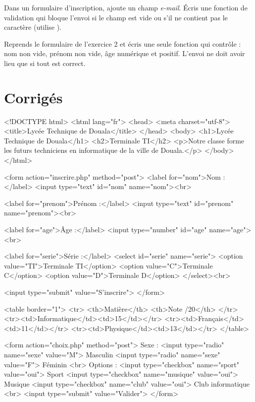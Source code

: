 Dans un formulaire d'inscription, ajoute un champ \emph{e-mail}. Écris une fonction
de validation qui bloque l'envoi si le champ est vide ou s'il ne contient pas le
caractère  (utilise ).

Reprends le formulaire de l'exercice 2 et écris une seule fonction 
qui contrôle : nom non vide, prénom non vide, âge numérique et positif. L'envoi ne
doit avoir lieu que si tout est correct.

\section{Corrigés}

\begin{codehtml}
<!DOCTYPE html>
<html lang="fr">
<head>
  <meta charset="utf-8">
  <title>Lycée Technique de Douala</title>
</head>
<body>
  <h1>Lycée Technique de Douala</h1>
  <h2>Terminale TI</h2>
  <p>Notre classe forme les futurs techniciens en informatique
     de la ville de Douala.</p>
</body>
</html>
\end{codehtml}

\begin{codehtml}
<form action="inscrire.php" method="post">
  <label for="nom">Nom :</label>
  <input type="text" id="nom" name="nom"><br>

  <label for="prenom">Prénom :</label>
  <input type="text" id="prenom" name="prenom"><br>

  <label for="age">Âge :</label>
  <input type="number" id="age" name="age"><br>

  <label for="serie">Série :</label>
  <select id="serie" name="serie">
    <option value="TI">Terminale TI</option>
    <option value="C">Terminale C</option>
    <option value="D">Terminale D</option>
  </select><br>

  <input type="submit" value="S'inscrire">
</form>
\end{codehtml}

\begin{codehtml}
<table border="1">
  <tr>
    <th>Matière</th>
    <th>Note /20</th>
  </tr>
  <tr><td>Informatique</td><td>15</td></tr>
  <tr><td>Français</td><td>11</td></tr>
  <tr><td>Physique</td><td>13</td></tr>
</table>
\end{codehtml}

\begin{codehtml}
<form action="choix.php" method="post">
  Sexe :
  <input type="radio" name="sexe" value="M"> Masculin
  <input type="radio" name="sexe" value="F"> Féminin
  <br>
  Options :
  <input type="checkbox" name="sport" value="oui"> Sport
  <input type="checkbox" name="musique" value="oui"> Musique
  <input type="checkbox" name="club" value="oui"> Club informatique
  <br>
  <input type="submit" value="Valider">
</form>
\end{codehtml}

